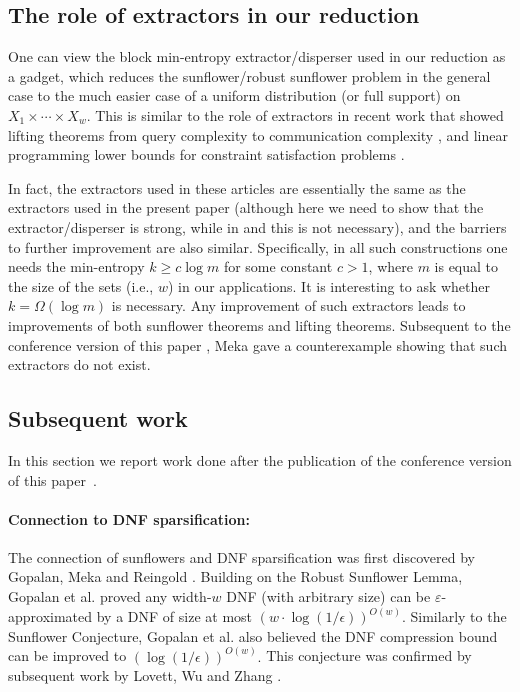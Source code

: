\documentclass{toc}
\newcommand{\eps}{\varepsilon}
\begin{document}
%
%
%

\subsection{The role of extractors in our reduction}
One can view the block min-entropy extractor/disperser used in our reduction as a gadget, which
reduces the sunflower/robust sunflower problem in the general case to the much easier case of a uniform distribution (or full support) on $X_{1}
\times \cdots \times X_{w}$. This is similar to the role of extractors
in recent %
work  %
that showed lifting theorems from query complexity to
communication complexity \cite{GLMWZ16}, and linear programming lower bounds for constraint satisfaction problems \cite{KMR17}.

In fact, the extractors used in these %
articles  %
are essentially the same as the extractors used in %
the present paper   %
(although %
here  %
we need to show that the extractor/disperser is strong, while
in \cite{GLMWZ16} and \cite{KMR17} this is not necessary), and the barriers
%
to  %
further improvement are also
similar. Specifically, in all such constructions one needs the min-entropy $k \geq c \log m$ for some constant $c>1$, where $m$ is equal to the size of the sets (i.e., $w$) in our applications. It is interesting to ask whether $k=\Omega(\log m)$ is necessary. Any improvement of such extractors leads
to  %
improvements of both sunflower theorems and lifting theorems. Subsequent to the conference version of
this paper \cite{conf-version}, %
Meka \cite{meka2018} gave a counterexample showing that such extractors do not exist.

%
\subsection{Subsequent work}   %
\label{sec: sub}

%
In this section we report work done after the publication of
the conference version of this paper~\cite{conf-version}.   %

\paragraph{Connection to DNF sparsification:} The connection of sunflowers and DNF sparsification was first discovered by Gopalan, Meka and Reingold \cite{gopalan2013dnf}. %
Building on the  %
%
Robust Sunflower Lemma,
Gopalan {et al.} \cite{gopalan2013dnf} proved any width-$w$ DNF (with arbitrary size) can be $\eps$-approximated by a DNF of size at most $(w\cdot \log(1/\epsilon))^{O(w)}.$
%
Similarly to  %
the Sunflower Conjecture, Gopalan {et al.} also believed the DNF compression bound can be improved to $( \log(1/\epsilon))^{O(w)}.$ This conjecture was confirmed by subsequent
%
work by   %
Lovett, Wu and Zhang \cite{lovett2019dnf2,LovettWZ19}.
\end{document}
